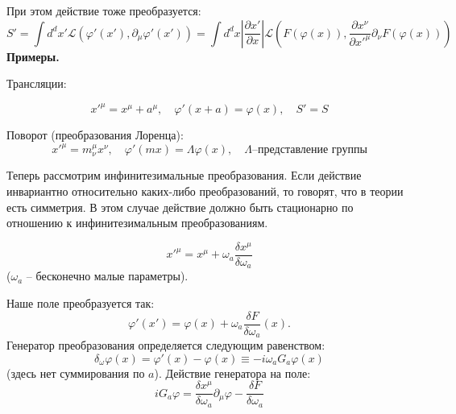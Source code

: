 \documentclass[a4paper,12pt]{article}
\theoremstyle{definition}
\theoremstyle{definition}
\theoremstyle{definition}
\begin{document}
При этом действие тоже преобразуется:
\begin{equation}
  \label{eq:305}
  S'=\int d^{d}x' \mathcal{L}(\varphi'(x'),\partial_{\mu} \varphi'(x'))=\int d^{d}x \left|\frac{\partial x'}{\partial x}\right| \mathcal{L}(F(\varphi(x)),\frac{\partial x^{\nu}}{\partial x'^{\mu}} \partial_{\nu}F(\varphi(x)))
\end{equation}
{\bf Примеры.}

Трансляции:

\begin{equation*}
  \label{eq:306}
  x'^{\mu}=x^{\mu}+a^{\mu},\quad \varphi'(x+a)=\varphi(x),\quad S'=S
\end{equation*}

Поворот (преобразования Лоренца):
\begin{equation*}
  x'^{\mu}=m^{\mu}_{\nu} x^{\nu}, \quad \varphi'(m x)=\Lambda \varphi(x),\quad \Lambda \mbox{--представление группы} 
\end{equation*}

Теперь рассмотрим инфинитезимальные преобразования.
Если действие инвариантно относительно каких-либо преобразований, то говорят, что в теории есть
симметрия. В этом случае действие должно быть стационарно по отношению к инфинитезимальным
преобразованиям. 

\begin{equation}
  \label{eq:165}
  x'^{\mu}=x^{\mu}+\omega_a \frac{\delta x^{\mu}}{\delta \omega_a}
\end{equation}
($\omega_{a}$ -- бесконечно малые параметры).

Наше поле преобразуется так:
\begin{equation}
  \label{eq:166}
  \varphi'(x')=\varphi(x)+\omega_a \frac{\delta F}{\delta \omega_a} (x).
\end{equation}
Генератор преобразования определяется следующим равенством:
\begin{equation}
  \label{eq:167}
  \delta_{\omega} \varphi(x)=\varphi'(x)-\varphi(x)\equiv -i\omega_a G_a \varphi(x)
\end{equation}
(здесь нет суммирования по $a$). Действие генератора на поле:
\begin{equation}
  \label{eq:168}
  iG_a \varphi=\frac{\delta x^{\mu}}{\delta\omega_a} \partial_{\mu}\varphi-\frac{\delta F}{\delta \omega_a}
\end{equation}
\end{document}
